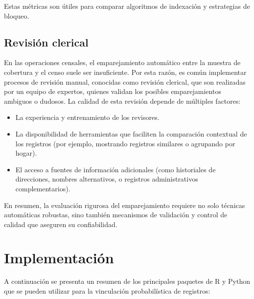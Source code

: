 \documentclass[
  12pt,
]{book}
\providecommand{\tightlist}{%
  \setlength{\itemsep}{0pt}\setlength{\parskip}{0pt}}
\begin{document}
Estas métricas son útiles para comparar algoritmos de indexación y estrategias de bloqueo.

\subsection{Revisión clerical}\label{revisiuxf3n-clerical}

En las operaciones censales, el emparejamiento automático entre la muestra de cobertura y el censo suele ser insuficiente. Por esta razón, es común implementar procesos de revisión manual, conocidas como revisión clerical, que son realizadas por un equipo de expertos, quienes validan los posibles emparejamientos ambiguos o dudosos. La calidad de esta revisión depende de múltiples factores:

\begin{itemize}
\tightlist
\item
  La experiencia y entrenamiento de los revisores.
\item
  La disponibilidad de herramientas que faciliten la comparación contextual de los registros (por ejemplo, mostrando registros similares o agrupando por hogar).
\item
  El acceso a fuentes de información adicionales (como historiales de direcciones, nombres alternativos, o registros administrativos complementarios).
\end{itemize}

En resumen, la evaluación rigurosa del emparejamiento requiere no solo técnicas automáticas robustas, sino también mecanismos de validación y control de calidad que aseguren su confiabilidad.

\section{Implementación}\label{implementaciuxf3n}

A continuación se presenta un resumen de los principales paquetes de R y Python que se pueden utilizar para la vinculación probabilística de registros:
\end{document}
